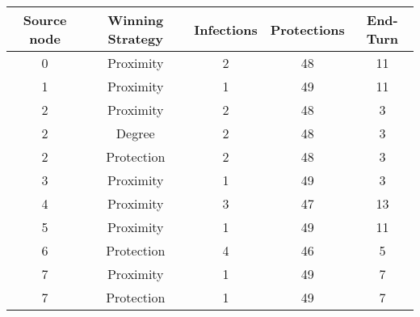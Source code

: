 \documentclass[results.tex]{subfiles}
\begin{document}
    \begin{center}
        \begin{tabular}{| c || c | c | c | c |}
            \hline
            {\bfseries Source node} & {\bfseries Winning Strategy} & {\bfseries Infections} & {\bfseries Protections}
            & {\bfseries End-Turn}
            \\  %
            \hline\hline
            0                       & Proximity                    & 2                      & 48                      & 11                   \\
            \hline
            1                       & Proximity                    & 1                      & 49                      & 11                   \\
            \hline
            2                       & Proximity                    & 2                      & 48                      & 3                    \\
            \hline
            2                       & Degree                       & 2                      & 48                      & 3                    \\
            \hline
            2                       & Protection                   & 2                      & 48                      & 3                    \\
            \hline
            3                       & Proximity                    & 1                      & 49                      & 3                    \\
            \hline
            4                       & Proximity                    & 3                      & 47                      & 13                   \\
            \hline
            5                       & Proximity                    & 1                      & 49                      & 11                   \\
            \hline
            6                       & Protection                   & 4                      & 46                      & 5                    \\
            \hline
            7                       & Proximity                    & 1                      & 49                      & 7                    \\
            \hline
            7                       & Protection                   & 1                      & 49                      & 7                    \\

\end{tabular}
\end{center}
\end{document}
